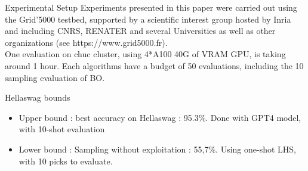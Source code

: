 \begin{frame}{Experimental Setup}
    Experiments presented in this paper were carried out using the Grid'5000 testbed, supported by a scientific interest group hosted by Inria and including CNRS, RENATER and several Universities as well as other organizations (see https://www.grid5000.fr).\\

    One evaluation on chuc cluster, using 4*A100 40G of VRAM GPU, is taking around 1 hour. Each algorithms have a budget of 50 evaluations, including the 10 sampling evaluation of BO. 

    \begin{block}{Hellaswag bounds}
        \begin{itemize}
            \item Upper bound : best accuracy on Hellaswag : 95.3\%. Done with GPT4 model, with 10-shot evaluation
            \item Lower bound : Sampling without exploitation : 55,7\%. Using one-shot LHS, with 10 picks to evaluate.
        \end{itemize}
        
        
    \end{block}
    
\end{frame}
